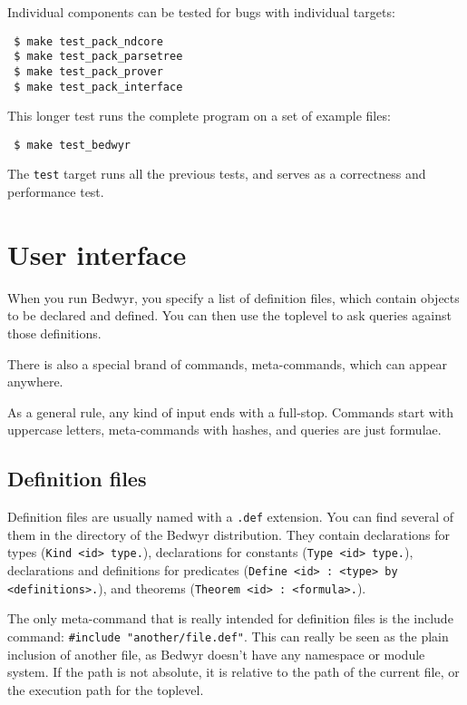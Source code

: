 Individual components can be tested for bugs with individual targets:

\begin{verbatim}
 $ make test_pack_ndcore
 $ make test_pack_parsetree
 $ make test_pack_prover
 $ make test_pack_interface
\end{verbatim}

This longer test runs the complete program on a set of example files:

\begin{verbatim}
 $ make test_bedwyr
\end{verbatim}

The \verb.test. target runs all the previous tests, and serves as a
correctness and performance test.


\section{User interface}

When you run Bedwyr, you specify a list of definition files, which
contain objects to be declared and defined.  You can then use the
toplevel to ask queries against those definitions.

There is also a special brand of commands, meta-commands, which can
appear anywhere.

As a general rule, any kind of input ends with a full-stop. Commands
start with uppercase letters, meta-commands with hashes, and queries
are just formulae.

\subsection{Definition files}

Definition files are usually named with a \verb|.def| extension.  You
can find several of them in the  directory of the Bedwyr
distribution.  They contain declarations for types
(\lstinline{Kind <id> type.}), declarations for constants
(\lstinline{Type <id> type.}), declarations and definitions for
predicates (\lstinline{Define <id> : <type> by <definitions>.}), and
theorems (\lstinline{Theorem <id> : <formula>.}).

The only meta-command that is really intended for definition files is
the include command: \lstinline{#include "another/file.def"}.  This can
really be seen as the plain inclusion of another file, as Bedwyr doesn't
have any namespace or module system.  If the path is not absolute, it is
relative to the path of the current file, or the execution path for the
toplevel.

